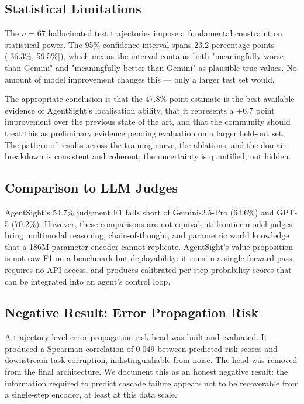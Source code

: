 \documentclass[11pt]{article}
\begin{document}
\subsection{Statistical Limitations}

The $n{=}67$ hallucinated test trajectories impose a fundamental constraint on statistical power. The 95\% confidence interval spans 23.2 percentage points ([36.3\%, 59.5\%]), which means the interval contains both "meaningfully worse than Gemini" and "meaningfully better than Gemini" as plausible true values. No amount of model improvement changes this — only a larger test set would.

The appropriate conclusion is that the 47.8\% point estimate is the best available evidence of AgentSight's localisation ability, that it represents a $+$6.7 point improvement over the previous state of the art, and that the community should treat this as preliminary evidence pending evaluation on a larger held-out set. The pattern of results across the training curve, the ablations, and the domain breakdown is consistent and coherent; the uncertainty is quantified, not hidden.

\subsection{Comparison to LLM Judges}

AgentSight's 54.7\% judgment F1 falls short of Gemini-2.5-Pro (64.6\%) and GPT-5 (70.2\%). However, these comparisons are not equivalent: frontier model judges bring multimodal reasoning, chain-of-thought, and parametric world knowledge that a 186M-parameter encoder cannot replicate. AgentSight's value proposition is not raw F1 on a benchmark but deployability: it runs in a single forward pass, requires no API access, and produces calibrated per-step probability scores that can be integrated into an agent's control loop.

\subsection{Negative Result: Error Propagation Risk}

A trajectory-level error propagation risk head was built and evaluated. It produced a Spearman correlation of 0.049 between predicted risk scores and downstream task corruption, indistinguishable from noise. The head was removed from the final architecture. We document this as an honest negative result: the information required to predict cascade failure appears not to be recoverable from a single-step encoder, at least at this data scale.
\end{document}
